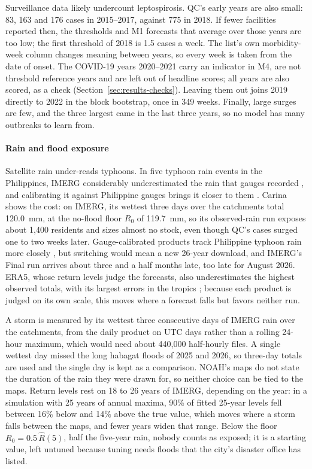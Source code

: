 Surveillance data likely undercount leptospirosis. QC's early years are also small: 83, 163 and
176 cases in 2015--2017, against 775 in 2018. If fewer facilities reported then, the thresholds
and M1 forecasts that average over those years are too low; the first threshold of 2018 is 1.5
cases a week. The list's own morbidity-week column changes meaning between years, so every
week is taken from the date of onset. The COVID-19 years 2020--2021 carry an indicator in M4, are
not threshold reference years and are left out of headline scores; all years are also scored,
as a check (Section~\ref{sec:results-checks}). Leaving them out joins 2019 directly to 2022 in the block bootstrap, once in 349
weeks. Finally, large surges are few, and the three largest came in the last three years, so no
model has many outbreaks to learn from.

\paragraph{Rain and flood exposure}
Satellite rain under-reads typhoons. In five typhoon rain events in the Philippines, IMERG
considerably underestimated the rain that gauges recorded \parencite{aryastana2022}, and
calibrating it against Philippine gauges brings it closer to them \parencite{veloria2021}.
Carina shows the cost: on
IMERG, its wettest three days over the catchments total 120.0~mm, at the no-flood floor $R_0$
of 119.7~mm, so its observed-rain run exposes about 1,400 residents and sizes almost no stock,
even though QC's cases surged one to two weeks later. Gauge-calibrated products track
Philippine typhoon rain more closely \parencite{bagtasa2022}, but switching would mean a new
26-year download, and IMERG's Final run arrives about three and a half months late, too late
for August 2026. ERA5, whose return levels judge the forecasts, also underestimates the highest
observed totals, with its largest errors in the tropics \parencite{lavers2022}; because each product is
judged on its own scale, this moves where a forecast falls but favors neither run.

A storm is measured by its wettest three consecutive days of IMERG rain over the catchments,
from the daily product on UTC days rather than a rolling 24-hour maximum, which would need
about 440,000 half-hourly files. A single wettest day missed the long habagat floods of 2025
and 2026, so three-day totals are used and the single day is kept as a comparison. NOAH's maps do
not state the duration of the rain they were drawn for, so neither choice can be tied to the
maps. Return levels rest on 18 to 26 years of IMERG, depending on the year: in a simulation with
25 years of annual maxima, 90\% of fitted 25-year levels fell between 16\% below and 14\% above
the true value, which moves where a storm falls between the maps, and fewer years widen that
range. Below the floor $R_0 = 0.5\,\hat{R}(5)$, half the five-year rain, nobody counts as
exposed; it is a starting value, left untuned because tuning needs floods that the city's
disaster office has listed.

